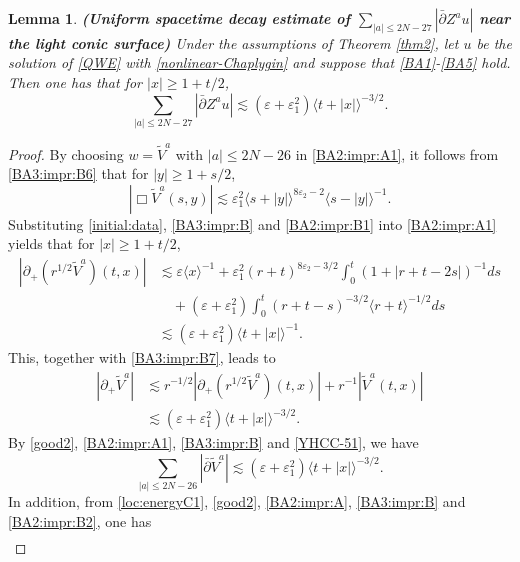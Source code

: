\documentclass[11pt,twoside]{article}
\def\ds{\displaystyle}
\def\p{\partial}
\def\ve{\varepsilon}
\def\ls{\lesssim}
\newcommand{\w}[1]{\langle {#1} \rangle}
\theoremstyle{plain}
\newtheorem{lemma}[theorem]{Lemma}
\theoremstyle{definition}
\numberwithin{equation}{section}
\begin{document}
\begin{lemma}
{\bf (Uniform spacetime decay estimate of $\ds\sum_{|a|\le2N-27}|\bar\p Z^au|$  near the light conic surface)}
Under the assumptions of Theorem \ref{thm2}, let $u$ be the solution of \eqref{QWE} with \eqref{nonlinear-Chaplygin}
and suppose that \eqref{BA1}-\eqref{BA5} hold.
Then one has that for $|x|\ge1+t/2$,
\begin{equation}\label{BA2:impr:B}
\sum_{|a|\le2N-27}|\bar\p Z^au|\ls(\ve+\ve_1^2)\w{t+|x|}^{-3/2}.
\end{equation}
\end{lemma}
\begin{proof}
By choosing $w=\tilde V^a$ with $|a|\le2N-26$ in \eqref{BA2:impr:A1}, it follows from \eqref{BA3:impr:B6} that for $|y|\ge1+s/2$,
\begin{equation}\label{BA2:impr:B1}
|\Box\tilde V^a(s,y)|\ls\ve_1^2\w{s+|y|}^{8\ve_2-2}\w{s-|y|}^{-1}.
\end{equation}
Substituting \eqref{initial:data}, \eqref{BA3:impr:B} and \eqref{BA2:impr:B1} into \eqref{BA2:impr:A1} yields that for $|x|\ge1+t/2$,
\begin{equation*}
\begin{split}
|\p_+(r^{1/2}\tilde V^a)(t,x)|&\ls\ve\w{x}^{-1}+\ve_1^2(r+t)^{8\ve_2-3/2}\int_0^t(1+|r+t-2s|)^{-1}ds\\
&\quad+(\ve+\ve_1^2)\int_0^t(r+t-s)^{-3/2}\w{r+t}^{-1/2}ds\\
&\ls(\ve+\ve_1^2)\w{t+|x|}^{-1}.
\end{split}
\end{equation*}
This, together with  \eqref{BA3:impr:B7}, leads to
\begin{equation}\label{YHCC-51}
\begin{split}
|\p_+\tilde V^a|&\ls r^{-1/2}|\p_+(r^{1/2}\tilde V^a)(t,x)|+r^{-1}|\tilde V^a(t,x)|\\
&\ls(\ve+\ve_1^2)\w{t+|x|}^{-3/2}.
\end{split}
\end{equation}
By \eqref{good2}, \eqref{BA2:impr:A1}, \eqref{BA3:impr:B} and \eqref{YHCC-51}, we have
\begin{equation}\label{BA2:impr:B2}
\sum_{|a|\le2N-26}|\bar\p\tilde V^a|\ls(\ve+\ve_1^2)\w{t+|x|}^{-3/2}.
\end{equation}
In addition, from \eqref{loc:energyC1}, \eqref{good2}, \eqref{BA2:impr:A}, \eqref{BA3:impr:B} and \eqref{BA2:impr:B2},
one has
\begin{equation}\label{BA2:impr:B3}
\begin{split}

\end{split}
\end{equation}
\end{proof}
\end{document}
